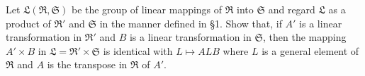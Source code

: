 Let $\mathfrak{L}(\mathfrak{R}, \mathfrak{S})$ be the group of linear mappings of $\mathfrak{R}$ into $\mathfrak{S}$ and regard $\mathfrak{L}$ as a product of $\mathfrak{R}'$ and $\mathfrak{S}$ in the manner defined in §1. Show that, if $A'$ is a linear transformation in $\mathfrak{R}'$ and $B$ is a linear transformation in $\mathfrak{S}$, then the mapping $A' \times B$ in $\mathfrak{L} = \mathfrak{R}' \times \mathfrak{S}$ is identical with $L \mapsto A L B$ where $L$ is a general element of $\mathfrak{R}$ and $A$ is the transpose in $\mathfrak{R}$ of $A'$.
